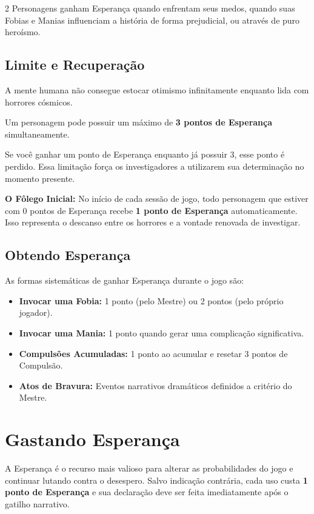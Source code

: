 \documentclass[a4paper,11pt,openany]{book}
\begin{document}
\begin{multicols}{2}
Personagens ganham Esperança quando enfrentam seus medos, quando suas Fobias e Manias influenciam a história de forma prejudicial, ou através de puro heroísmo.

\subsection{Limite e Recuperação}

A mente humana não consegue estocar otimismo infinitamente enquanto lida com horrores cósmicos. 

\begin{regra}
Um personagem pode possuir um máximo de \textbf{3 pontos de Esperança} simultaneamente. 

Se você ganhar um ponto de Esperança enquanto já possuir 3, esse ponto é perdido. Essa limitação força os investigadores a utilizarem sua determinação no momento presente.
\end{regra}

\textbf{O Fôlego Inicial:} No início de cada sessão de jogo, todo personagem que estiver com 0 pontos de Esperança recebe \textbf{1 ponto de Esperança} automaticamente. Isso representa o descanso entre os horrores e a vontade renovada de investigar.

\subsection{Obtendo Esperança}

As formas sistemáticas de ganhar Esperança durante o jogo são:

\begin{itemize}
\item \textbf{Invocar uma Fobia:} 1 ponto (pelo Mestre) ou 2 pontos (pelo próprio jogador).
\item \textbf{Invocar uma Mania:} 1 ponto quando gerar uma complicação significativa.
\item \textbf{Compulsões Acumuladas:} 1 ponto ao acumular e resetar 3 pontos de Compulsão.
\item \textbf{Atos de Bravura:} Eventos narrativos dramáticos definidos a critério do Mestre.
\end{itemize}
\columnbreak
\section{Gastando Esperança}

A Esperança é o recurso mais valioso para alterar as probabilidades do jogo e continuar lutando contra o desespero. Salvo indicação contrária, cada uso custa \textbf{1 ponto de Esperança} e sua declaração deve ser feita imediatamente após o gatilho narrativo.


\end{multicols}
\end{document}
